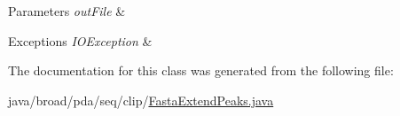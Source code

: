 \begin{DoxyParams}{Parameters}
{\em out\+File} & \\
\hline
\end{DoxyParams}

\begin{DoxyExceptions}{Exceptions}
{\em I\+O\+Exception} & \\
\hline
\end{DoxyExceptions}


The documentation for this class was generated from the following file\+:\begin{DoxyCompactItemize}
\item 
java/broad/pda/seq/clip/\hyperlink{_fasta_extend_peaks_8java}{Fasta\+Extend\+Peaks.\+java}\end{DoxyCompactItemize}
